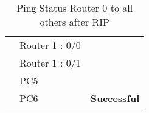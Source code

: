 \documentclass[a4paper,11pt]{article}
\begin{document}
\begin{enumerate}
\begin{table}[H]
\begin{tabular}{| m{10em}| m{10em}| m{10em} |}
                  \hhline{|>{\arrayrulecolor[rgb]{0.141,0.525,1}}->{\arrayrulecolor{black}}->{\arrayrulecolor[rgb]{0.42,0.988,0.827}}->{\arrayrulecolor{black}}|}
                  {\cellcolor[rgb]{0.141,0.525,1}}                                     & Router 1 : 0/0       & {\cellcolor[rgb]{0.42,0.988,0.827}}                                        \\
                  \hhline{|>{\arrayrulecolor[rgb]{0.141,0.525,1}}->{\arrayrulecolor{black}}->{\arrayrulecolor[rgb]{0.42,0.988,0.827}}->{\arrayrulecolor{black}}|}
                  {\cellcolor[rgb]{0.141,0.525,1}}                                     & Router 1 : 0/1       & {\cellcolor[rgb]{0.42,0.988,0.827}}                                        \\
                  \hhline{|>{\arrayrulecolor[rgb]{0.141,0.525,1}}->{\arrayrulecolor{black}}->{\arrayrulecolor[rgb]{0.42,0.988,0.827}}->{\arrayrulecolor{black}}|}
                  {\cellcolor[rgb]{0.141,0.525,1}}                                     & PC5                  & {\cellcolor[rgb]{0.42,0.988,0.827}}                                        \\
                  \hhline{|>{\arrayrulecolor[rgb]{0.141,0.525,1}}->{\arrayrulecolor{black}}->{\arrayrulecolor[rgb]{0.42,0.988,0.827}}->{\arrayrulecolor{black}}|}
                  \multirow{-10}{*}{{\cellcolor[rgb]{0.141,0.525,1}}\textbf{Router 0}} & PC6                  & \multirow{-10}{*}{{\cellcolor[rgb]{0.42,0.988,0.827}} \textbf{Successful}} \\
                  \hline
              \end{tabular}
              \caption{ Ping Status Router 0 to all others after RIP}
          \end{table}





          \begin{table}[H]
              \centering


\end{table}
\end{enumerate}
\end{document}
